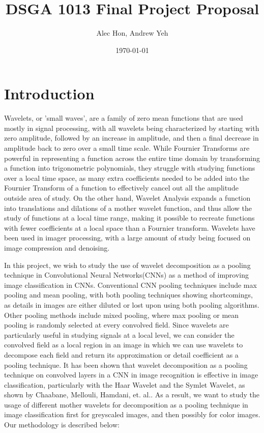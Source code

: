 \documentclass{article}
\begin{document}
\title{\large DSGA 1013 Final Project Proposal}
\author{\small Alec Hon, Andrew Yeh}
\date{\footnotesize \today}
\maketitle

\section{Introduction}

Wavelets, or 'small waves', are a family of zero mean functions that are used mostly in signal processing, with all wavelets being characterized by starting with zero amplitude, followed by an increase in amplitude, and then a final decrease in amplitude back to zero over a small time scale. While Fournier Transforms are powerful in representing a function across the entire time domain by transforming a function into trigonometric polynomials, they struggle with studying functions over a local time space, as many extra coefficients needed to be added into the Fournier Transform of a function to effectively cancel out all the amplitude outside area of study. On the other hand, Wavelet Analysis expands a function into translations and dilations of a mother wavelet function, and thus allow the study of functions at a local time range,  making it possible to recreate functions with fewer coefficients at a local space than a Fournier transform. Wavelets have been used in imager processing, with a large amount of study being focused on image compression and denoising.  
 \newline
 
\noindent In this project, we wish to study the use of wavelet decomposition as a pooling technique in Convolutional Neural Networks(CNNs) as a method of improving image classification in CNNs. Conventional CNN pooling techniques include max pooling and mean pooling, with both pooling techniques showing shortcomings, as details in images are either diluted or lost upon using both pooling algorithms. Other pooling methods include mixed pooling, where max pooling or mean pooling is randomly selected at every convolved field. Since wavelets are particularly useful in studying signals at a local level, we can consider the convolved field as a local region in an image in which we can use wavelets to decompose each field and return its approximation or detail coefficient as a pooling technique. It has been shown that wavelet decomposition as a pooling technique on convolved layers in a CNN in image recognition is effective in image classification, particularly with the Haar Wavelet and the Symlet Wavelet, as shown by Chaabane, Mellouli, Hamdani, et. al.. As a result, we want to study the usage of different mother wavelets for decomposition as a pooling technique in image classification first for greyscaled images, and then possibly for color images. Our methodology is described below:
\end{document}
